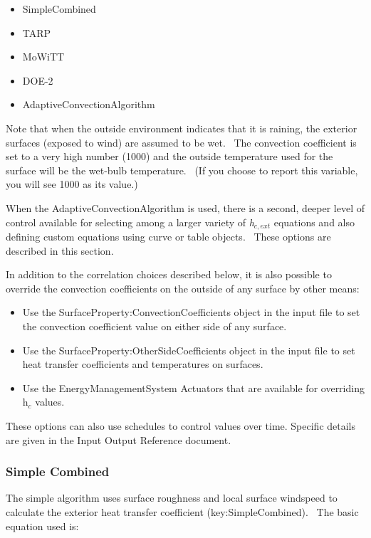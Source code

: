 \begin{itemize}
\item
  SimpleCombined
\item
  TARP
\item
  MoWiTT
\item
  DOE-2
\item
  AdaptiveConvectionAlgorithm
\end{itemize}

Note that when the outside environment indicates that it is raining, the exterior surfaces (exposed to wind) are assumed to be wet.~ The convection coefficient is set to a very high number (1000) and the outside temperature used for the surface will be the wet-bulb temperature.~ (If you choose to report this variable, you will see 1000 as its value.)

When the AdaptiveConvectionAlgorithm is used, there is a second, deeper level of control available for selecting among a larger variety of \emph{h\(_{c,ext}\)} equations and also defining custom equations using curve or table objects.~ These options are described in this section.

In addition to the correlation choices described below, it is also possible to override the convection coefficients on the outside of any surface by other means:

\begin{itemize}
\item
  Use the SurfaceProperty:ConvectionCoefficients object in the input file to set the convection coefficient value on either side of any surface.
\item
  Use the SurfaceProperty:OtherSideCoefficients object in the input file to set heat transfer coefficients and temperatures on surfaces.
\item
  Use the EnergyManagementSystem Actuators that are available for overriding h\(_{c}\) values.
\end{itemize}

These options can also use schedules to control values over time. Specific details are given in the Input Output Reference document.

\subsubsection{Simple Combined}\label{simple-combined}

The simple algorithm uses surface roughness and local surface windspeed to calculate the exterior heat transfer coefficient (key:SimpleCombined).~ The basic equation used is:

